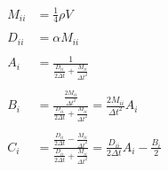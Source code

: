 \begin{equation}
\label{eq:vector_component_abc}
\begin{aligned}
M_{ii} &= \frac{1}{4} \rho V \\ \\
D_{ii} &= \alpha M_{ii} \\ \\
A_i &= \frac{1}{\frac{D_{ii}}{2 \Delta t} + \frac{M_{ii}}{\Delta t^2}}\\ \\
B_i &= \frac{\frac{2M_{ii}}{\Delta t^2}}{\frac{D_{ii}}{2 \Delta t} +
  \frac{M_{ii}}{\Delta t^2}} = \frac{2M_{ii}}{\Delta t^2}A_i \\ \\
C_i &= \frac{\frac{D_{ii}}{2 \Delta t} - \frac{M_{ii}}{\Delta
    t^2}}{\frac{D_{ii}}{2 \Delta t} + \frac{M_{ii}}{\Delta t^2}} = 
\frac{D_{ii}}{2\Delta t}A_i - \frac{B_i}{2} \\
\end{aligned}
\end{equation}


 






